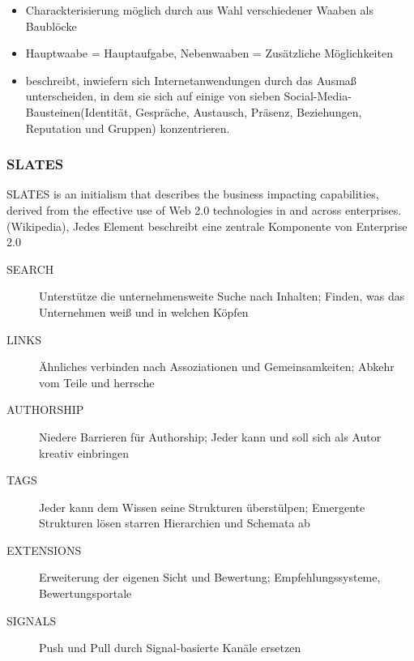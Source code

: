\documentclass{article} %
\begin{document}
	\begin{itemize}
		\item Charackterisierung möglich durch aus Wahl verschiedener Waaben als Baublöcke
		\item Hauptwaabe = Hauptaufgabe, Nebenwaaben = Zusätzliche Möglichkeiten
		\item  beschreibt, inwiefern sich Internetanwendungen durch das Ausmaß unterscheiden, in dem sie sich auf einige von sieben Social-Media-Bausteinen(Identität, Gespräche, Austausch, Präsenz, Beziehungen, Reputation und Gruppen) konzentrieren.
	\end{itemize}
	\subsubsection{SLATES}
	\glqq SLATES is an initialism that describes the business impacting capabilities, derived from the effective use of Web 2.0 technologies in and across enterprises.\grqq (Wikipedia), Jedes Element beschreibt eine zentrale Komponente von Enterprise 2.0
	\begin{description}
		\item[SEARCH] Unterstütze die unternehmensweite Suche nach Inhalten;
		Finden, was das Unternehmen weiß und in welchen Köpfen
		\item[LINKS] Ähnliches verbinden nach Assoziationen und Gemeinsamkeiten;
		Abkehr vom  \glqq Teile und herrsche\glqq 
		\item[AUTHORSHIP] Niedere Barrieren für Authorship;
		Jeder kann und soll sich als Autor kreativ einbringen
		\item[TAGS] Jeder kann dem Wissen seine Strukturen überstülpen;
		Emergente Strukturen lösen starren Hierarchien und Schemata ab
		\item[EXTENSIONS] Erweiterung der eigenen Sicht und Bewertung;
		Empfehlungssysteme, Bewertungsportale
		\item[SIGNALS] Push und Pull durch Signal-basierte Kanäle ersetzen
	\end{description}
\end{document}
